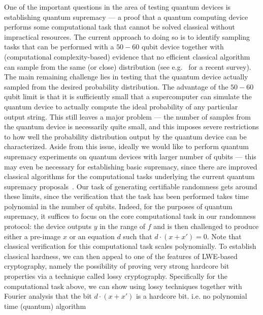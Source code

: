 \documentclass[11pt]{article}
\theoremstyle{remark}
\theoremstyle{definition}
\begin{document}
One of the important questions in the area of testing quantum devices is establishing quantum supremacy --- a proof that a quantum computing device performs some 
computational task that cannot be solved classical without impractical resources. The current approach to doing so is to identify sampling tasks that can be performed with
a $50-60$ qubit device together with (computational complexity-based) evidence that no efficient classical algorithm can sample from the same (or close) distribution (see e.g.~\cite{harrow2017quantum} for a recent survey). The main remaining challenge lies in testing that the quantum device actually sampled from the desired probability distribution. The advantage of the $50-60$ qubit limit is that it is sufficiently small that a supercomputer can simulate the quantum device to actually compute the ideal probability of any particular output string. This still leaves a major problem --- the number of samples from the quantum device is necessarily quite small, and this imposes severe restrictions to how well the probability distribution output by the quantum device can be characterized. Aside from this issue,
ideally we would like to perform quantum supremacy experiments on quantum devices with larger number of qubits --- 
this may even be necessary for establishing basic supremacy, since there are improved classical algorithms for the computational tasks underlying the current quantum supremacy proposals~\cite{pednault2017breaking,clifford2018classical}. Our task of generating certifiable randomness gets around these limits, since the verification that the task has been performed takes time polynomial in the number of qubits. Indeed, for the purposes of quantum supremacy, it suffices to focus on the core computational task in our randomness protocol: the device outputs $y$ in the range of $f$ and is then challenged to produce either a pre-image $x$ or an equation $d$ such that  $d\cdot(x + x') = 0$. Note that classical verification for this computational task
scales polynomially. To establish classical hardness, we can then appeal to one of the features of LWE-based cryptography, namely the possibility of proving very strong hardcore bit properties via a technique called lossy cryptography. Specifically for the computational task above, we can show using lossy techniques together with Fourier analysis that the bit $d\cdot(x + x')$ is a hardcore bit. i.e. no polynomial time (quantum) algorithm 
\end{document}
